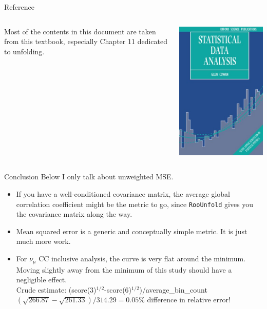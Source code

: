 \documentclass[aspectratio=169]{beamer}
\begin{document}
\begin{frame}{Reference}
  \begin{columns}
    \begin{column}{.5\textwidth}
      Most of the contents in this document are taken from this textbook, especially Chapter 11 dedicated to unfolding.
    \end{column}
    \begin{column}{.5\textwidth}
      \centering
      \includegraphics[height=\textheight]{figures/cowan_front_cover.jpeg}
    \end{column}
  \end{columns}
\end{frame}

\begin{frame}{Conclusion}
Below I only talk about unweighted MSE.
  \begin{itemize}
    \item If you have a well-conditioned covariance matrix, the average global correlation coefficient might be the metric to go, since \texttt{RooUnfold} gives you the covariance matrix along the way.
    \item Mean squared error is a generic and conceptually simple metric. It is just much more work.
    \item For $\nu_\mu$ CC inclusive analysis, the curve is very flat around the minimum. Moving slightly away from the minimum of this study should have a negligible effect.\\
    Crude estimate: (score(3)$^{1/2}$-score(6)$^{1/2}$)/average\_bin\_count \\
    $(\sqrt{266.87}-\sqrt{261.33})/314.29=0.05\%$ difference in relative error!
  \end{itemize}
\end{frame}
\end{document}
